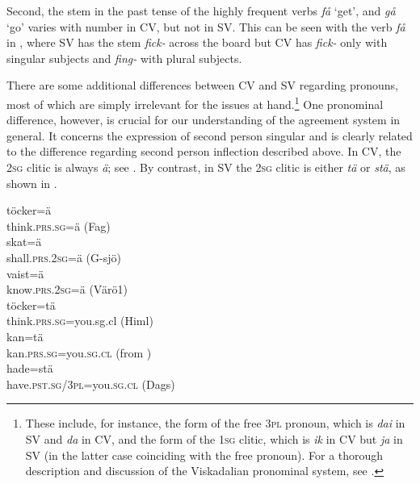 \documentclass[output=paper,colorlinks,citecolor=brown,draft,draftmode]{langscibook}
\begin{document}
Second, the stem in the past tense of the highly frequent verbs \textit{få} ‘get’, and \textit{gå} ‘go’ varies with number in CV, but not in SV. This can be seen with the verb \textit{få} in , where SV has the stem \textit{fick-} across the board but CV has \textit{fick-} only with singular subjects and \textit{fing-} with plural subjects.



There are some additional differences between CV and SV regarding pronouns, most of which are simply irrelevant for the issues at hand.\footnote{These include, for instance, the form of the free 3\textsc{pl} pronoun, which is \textit{dai} in SV and \textit{da} in CV, and the form of the 1\textsc{sg} clitic, which is \textit{ik} in CV but \textit{ja} in SV (in the latter case coinciding with the free pronoun). For a thorough description and discussion of the Viskadalian pronominal system, see \citet{Petzell2017}.} One pronominal difference, however, is crucial for our understanding of the agreement system in general. It concerns the expression of second person singular and is clearly related to the difference regarding second person inflection described above. In CV, the 2\textsc{sg} clitic is always \textit{ä}; see . By contrast, in SV the 2\textsc{sg} clitic is either \textit{tä} or \textit{stä}, as shown in .


\ea\label{ex:petzell:19}
\ea\label{ex:petzell:19a}
\gll töcker=ä \\
    think.\textsc{prs.sg=}ä (Fag)    \\
\ex\label{ex:petzell:19b}
\gll skat=ä   \\
    shall.\textsc{prs}.2\textsc{sg}=ä (G-sjö)  \\
\ex\label{ex:petzell:19c}
\gll vaist=ä   \\
    know.\textsc{prs}.2\textsc{sg}=ä (Värö1)\\
\z
\ex\label{ex:petzell:20}
\ea\label{ex:petzell:20a}
\gll töcker=tä \\
    think.\textsc{prs.sg}=you.sg.cl (Himl)  \\
\ex\label{ex:petzell:20b}
\gll kan=tä   \\
    kan.\textsc{prs.sg}=you.\textsc{sg}.\textsc{cl} (from \citealt{Andersson1922})  \\
\ex\label{ex:petzell:20c}
\gll hade=stä   \\
    have.\textsc{pst}.\textsc{sg}/3\textsc{pl}=you.\textsc{sg}.\textsc{cl} (Dags)\\
\z
\z
\end{document}
